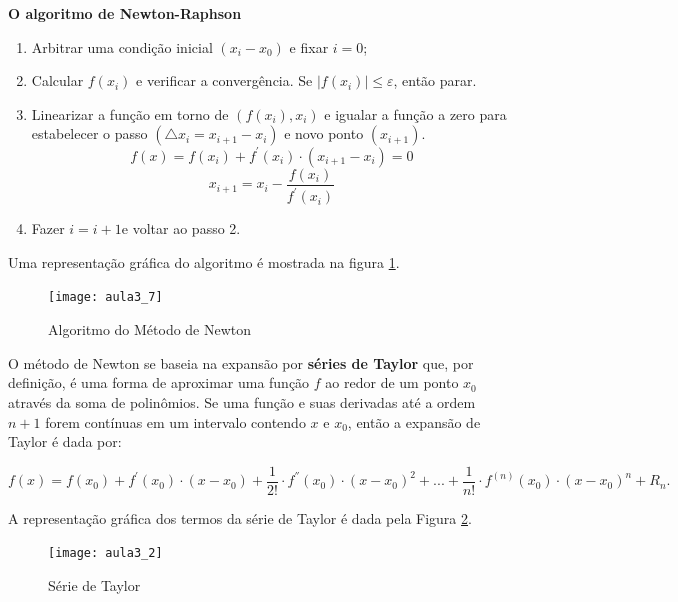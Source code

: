 \begin{framed} %
    \textbf{O algoritmo de Newton-Raphson}
    
    \begin{enumerate}
    \item Arbitrar uma condição inicial $(x_{i}-x_{0})$ e fixar $i=0$;
    
    \item Calcular $f(x_{i})$ e verificar a convergência. Se $|f(x_{i})|\leq \varepsilon$, então parar.
    
    \item Linearizar a função em torno de $(f(x_{i}),x_{i})$ e igualar a função
    a zero para estabelecer o passo $(\triangle x_{i}=x_{i+1}-x_{i})$
    e novo ponto $(x_{i+1})$.
    $$f(x)=f(x_{i})+f^{'}(x_{i})\cdot(x_{i+1}-x_{i})=0$$
    $$x_{i+1}=x_{i}-\frac{f(x_{i})}{f^{'}(x_{i})}$$
    
    \item Fazer $i=i+1$e voltar ao passo 2.
    
    \end{enumerate}
    
    Uma representação  gráfica do algoritmo é mostrada na figura \ref{fig:aula3_7}.
    
\end{framed}

\begin{figure}[H]
\begin{centering}
\texttt{[image: aula3\_7]}\protect\caption{\label{fig:aula3_7} Algoritmo do Método de Newton  }
\end{centering}
\end{figure}

O método de Newton se baseia na expansão por \textbf{séries de Taylor} que, por definição, é uma forma de aproximar uma função $f$ ao redor de um ponto $x_{0}$ através da soma de polinômios.
Se uma função e suas derivadas até a ordem $n+1$ forem contínuas
em um intervalo contendo $x$ e $x_{0}$, então a expansão de Taylor é dada por: 

\[
f(x)=f(x_{0})+f^{'}(x_{0})\cdot(x-x_{0})+\frac{1}{2!}\cdot f^{''}(x_{0})\cdot(x-x_{0})^{2}+...+\frac{1}{n!}\cdot f^{(n)}(x_{0})\cdot(x-x_{0})^{n}+R_{n}.
\]

A representação gráfica dos termos da série de Taylor é dada pela Figura \ref{fig:aula3_2}.

\begin{figure}[H]
\begin{centering}
\texttt{[image: aula3\_2]}\protect\caption{\label{fig:aula3_2} Série de Taylor }
\end{centering}
\end{figure}


